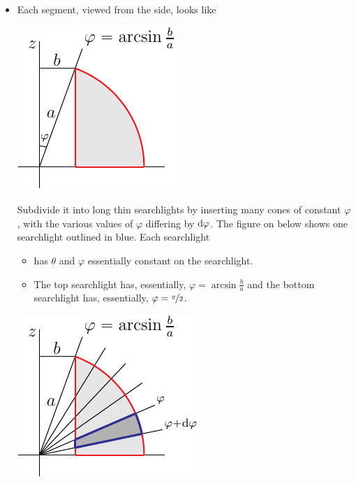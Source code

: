 \begin{eg}
\begin{itemize}
\item 
Each segment, viewed from the side, looks like
\begin{efig}
\begin{center}
    \includegraphics{appleCoreB2.pdf}
\end{center}
\end{efig}
Subdivide it into long thin searchlights
by inserting many cones of constant $\varphi$, with the various values of 
$\varphi$ differing by $\mathrm{d}\varphi$. The figure on below shows 
one searchlight outlined in blue. Each searchlight
\vspace{-\topsep}
\begin{itemize} \itemsep1pt \parskip0pt 
\item
has $\theta$  and $\varphi$ essentially constant on the searchlight. 
\item The top searchlight has, essentially, $\varphi=\arcsin\frac{b}{a}$ 
and the bottom searchlight has, essentially, $\varphi=\nicefrac{\pi}{2}$.  
\end{itemize}
\vspace{-\topsep}
\begin{efig}
\begin{center}
    \includegraphics{appleCoreB3.pdf}\qquad
\end{center}
\end{efig}


\end{itemize}
\end{eg}
